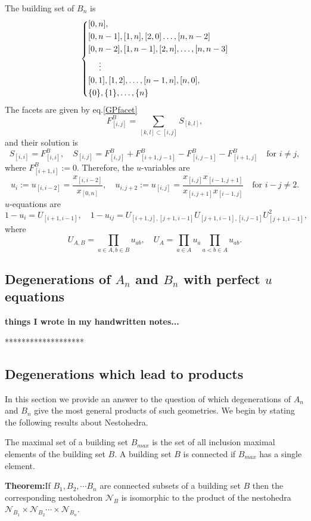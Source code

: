 \documentclass[hidelinks,12pt]{article}
\begin{document}
The building set of $B_n$ is
\[\left\{
\begin{aligned}
	&[0,n],\\
	&[0,n-1],[1,n],[2,0]\dots,[n,n-2]\\
	&[0,n-2],[1,n-1],[2,n],\dots,[n,n-3]\\
	&\hspace{3ex}\vdots\\
	&[0,1],[1,2],\dots,[n-1,n],[n,0],\\
	&\{0\},\{1\},\dots,\{n\}
\end{aligned}\right.
\]
The facets are given by eq.\eqref{GPfacet}
\[
F^B_{[i,j]}=\sum_{[k,l]\subset [i,j]}S_{[k,l]},
\]
and their solution is 
\[
S_{[i,i]}=F^B_{[i,i]},\quad S_{[i,j]}=F^B_{[i,j]}+F^B_{[i+1,j-1]}-F^B_{[i,j-1]}-F^B_{[i+1,j]}\quad \text{for $i\neq j$},
\]
where $F^B_{[i+1,i]}:=0$. Therefore, the $u$-variables are
\[
u_i:=u_{[i,i-2]}=\frac{x_{[i,i-2]}}{x_{[0,n]}},\quad 
u_{i,j+2}:=u_{[i,j]}=\frac{x_{[i,j]}x_{[i-1,j+1]}}{x_{[i,j+1]}x_{[i-1,j]}}
\quad \text{for $i-j\neq 2$}.
\]
$u$-equations are
\[
1-u_i=U_{[i+1,i-1]},\quad 
1-u_{ij}=U_{[i+1,j],[j+1,i-1]}U_{[j+1,i-1],[i,j-1]}U^2_{[j+1,i-1]},
\]
where 
\[
U_{A,B}=\prod_{a\in A,b\in B}u_{ab},\quad 
U_A=\prod_{a\in A}u_a\prod_{a<b\in A}u_{ab}.
\]


\subsection{Degenerations of $A_n$ and $B_n$ with perfect $u$ equations} 

{\bf things I wrote in my handwritten notes...}

*******************
\subsection*{Degenerations which lead to products}
In this section we provide an answer to the question of which degenerations of $A_n$ and $B_n$ give the most general products of such geometries. We begin by stating the following results about Nestohedra.

The maximal set of a building set $B_{max}$ is the set of all inclusion maximal elements of the building set $B$. A building set $B$ is connected if $B_{max}$ has a single element.

{\bf Theorem:}If $B_1, B_2,\cdots B_n$ are connected subsets of a building set $B$ then the corresponding nestohedron ${\mathscr N_B}$ is isomorphic to the product of the nestohedra ${\mathscr N}_{ B_1} \times{\mathscr N}_{ B_2} \cdots \times {\mathscr N}_{B_n}$.
\end{document}
